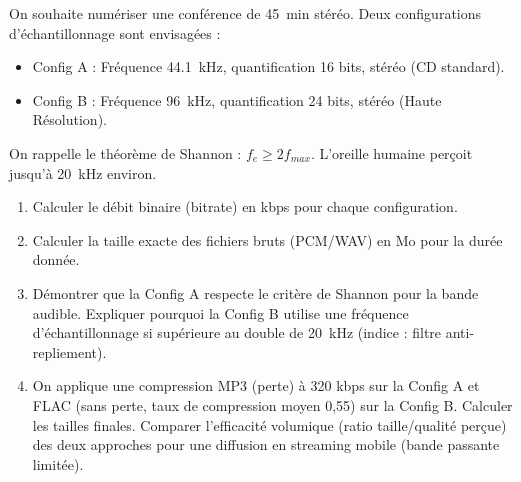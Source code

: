 \documentclass[11pt]{article}
\begin{document}
\begin{exercice}
On souhaite numériser une conférence de \SI{45}{min} stéréo. Deux configurations d'échantillonnage sont envisagées :
\begin{itemize}
    \item Config A : Fréquence \SI{44,1}{kHz}, quantification 16 bits, stéréo (CD standard).
    \item Config B : Fréquence \SI{96}{kHz}, quantification 24 bits, stéréo (Haute Résolution).
\end{itemize}
On rappelle le théorème de Shannon : $f_e \ge 2 f_{max}$. L'oreille humaine perçoit jusqu'à \SI{20}{kHz} environ.

\begin{enumerate}
    \item Calculer le débit binaire (bitrate) en kbps pour chaque configuration.
    \item Calculer la taille exacte des fichiers bruts (PCM/WAV) en Mo pour la durée donnée.
    \item Démontrer que la Config A respecte le critère de Shannon pour la bande audible. Expliquer pourquoi la Config B utilise une fréquence d'échantillonnage si supérieure au double de \SI{20}{kHz} (indice : filtre anti-repliement).
    \item On applique une compression MP3 (perte) à 320 kbps sur la Config A et FLAC (sans perte, taux de compression moyen 0,55) sur la Config B. Calculer les tailles finales. Comparer l'efficacité volumique (ratio taille/qualité perçue) des deux approches pour une diffusion en streaming mobile (bande passante limitée).
\end{enumerate}
\end{exercice}
\end{document}
